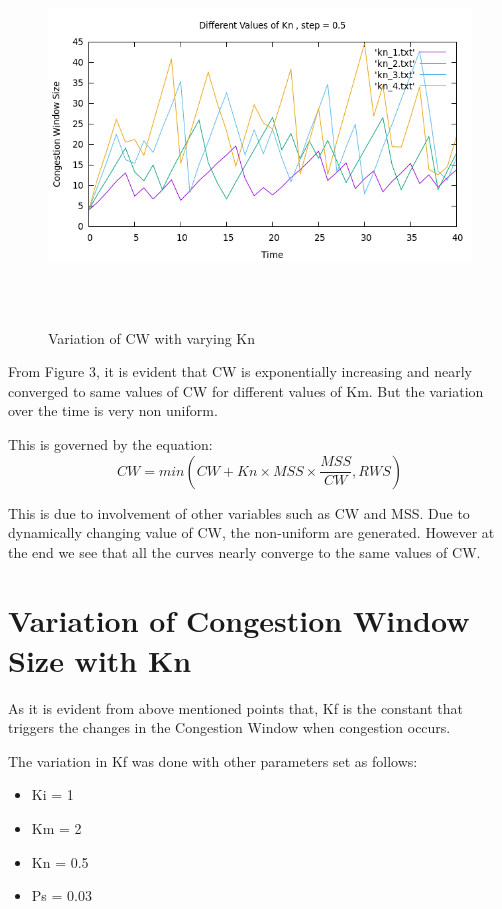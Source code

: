 \documentclass[12pt]{article}
\begin{document}
\begin{figure}
    \centering
    \includegraphics[width=15cm, height=10cm]{kn.png}
    \caption{Variation of CW with varying Kn}
\end{figure}

From Figure 3, it is evident that CW is exponentially increasing and nearly converged to same values of CW for different values of Km.
But the variation over the time is very non uniform. 

This is governed by the equation:
\begin{equation*}
    CW = min(CW + Kn \times MSS \times \frac{MSS}{CW}, RWS)
\end{equation*}

This is due to involvement of other variables such as CW and MSS. Due to dynamically changing value of CW, the non-uniform are generated. However at the end we see that all the curves nearly converge to the same values of CW.


\section{Variation of Congestion Window Size with Kn}
As it is evident from above mentioned points that, Kf is the constant that triggers the changes in the Congestion Window when congestion occurs.

The variation in Kf was done with other parameters set as follows:
\begin{itemize}
    \item Ki = 1
    \item Km = 2
    \item Kn = 0.5
    \item Ps = 0.03
\end{itemize}
\end{document}
